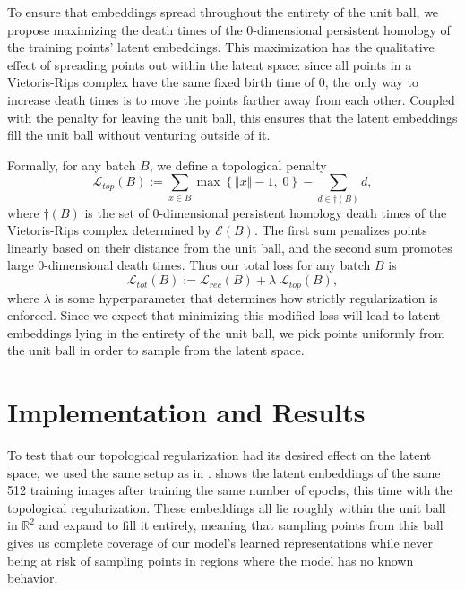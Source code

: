 \documentclass[conference]{IEEEtran}
\newcommand{\R}{\mathbb{R}}
\begin{document}
To ensure that embeddings spread throughout the entirety of the unit ball, we propose maximizing the death times of the 0-dimensional persistent homology of the training points' latent embeddings. This maximization has the qualitative effect of spreading points out within the latent space: since all points in a Vietoris-Rips complex have the same fixed birth time of 0, the only way to increase death times is to move the points farther away from each other. Coupled with the penalty for leaving the unit ball, this ensures that the latent embeddings fill the unit ball without venturing outside of it.

Formally, for any batch $B$, we define a topological penalty
\[
	\mathcal{L}_{top}(B) :=  \sum_{x \in B} \max\left\{ {\Vert{x}\Vert}-1, \;0 \right\} - \sum_{d \in \dagger(B)} d,
\]
where $\dagger(B)$ is the set of 0-dimensional persistent homology death times of the Vietoris-Rips complex determined by $\mathcal{E}(B)$. The first sum penalizes points linearly based on their distance from the unit ball, and the second sum promotes large 0-dimensional death times. Thus our total loss for any batch $B$ is
\[
	\mathcal{L}_{tot}(B) := \mathcal{L}_{rec}(B) + \lambda \; \mathcal{L}_{top}(B),
\] where $\lambda$ is some hyperparameter that determines how strictly regularization is enforced. Since we expect that minimizing this modified loss will lead to latent embeddings lying in the entirety of the unit ball, we pick points uniformly from the unit ball in order to sample from the latent space.

\section{Implementation and Results}

To test that our topological regularization had its desired effect on the latent space, we used the same setup as in .  shows the latent embeddings of the same 512 training images after training the same number of epochs, this time with the topological regularization. These embeddings all lie roughly within the unit ball in $\R^2$ and expand to fill it entirely, meaning that sampling points from this ball gives us complete coverage of our model's learned representations while never being at risk of sampling points in regions where the model has no known behavior.
\end{document}
